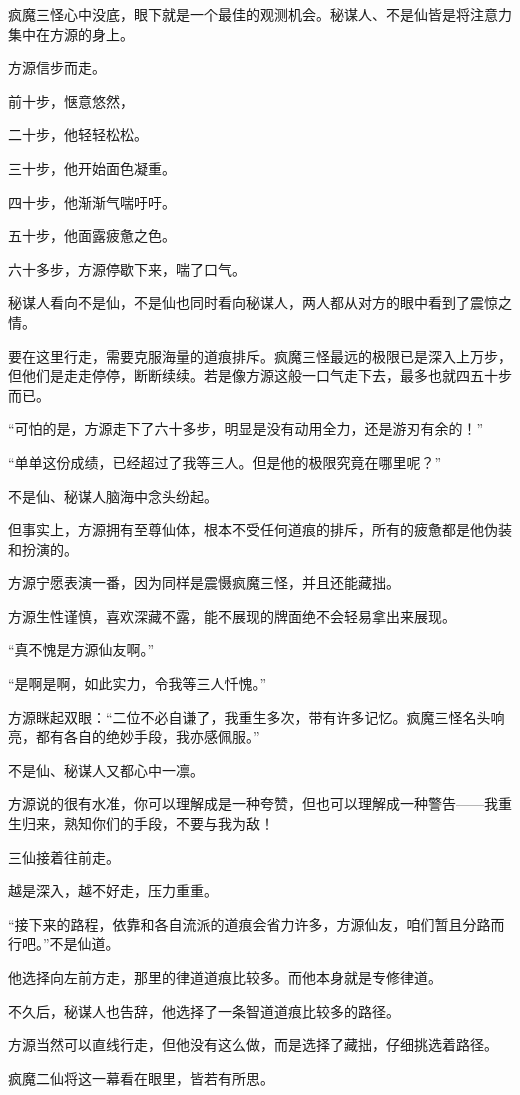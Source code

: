 \begin{this_body}
疯魔三怪心中没底，眼下就是一个最佳的观测机会。秘谋人、不是仙皆是将注意力集中在方源的身上。

方源信步而走。

前十步，惬意悠然，

二十步，他轻轻松松。

三十步，他开始面色凝重。

四十步，他渐渐气喘吁吁。

五十步，他面露疲惫之色。

六十多步，方源停歇下来，喘了口气。

秘谋人看向不是仙，不是仙也同时看向秘谋人，两人都从对方的眼中看到了震惊之情。

要在这里行走，需要克服海量的道痕排斥。疯魔三怪最远的极限已是深入上万步，但他们是走走停停，断断续续。若是像方源这般一口气走下去，最多也就四五十步而已。

“可怕的是，方源走下了六十多步，明显是没有动用全力，还是游刃有余的！”

“单单这份成绩，已经超过了我等三人。但是他的极限究竟在哪里呢？”

不是仙、秘谋人脑海中念头纷起。

但事实上，方源拥有至尊仙体，根本不受任何道痕的排斥，所有的疲惫都是他伪装和扮演的。

方源宁愿表演一番，因为同样是震慑疯魔三怪，并且还能藏拙。

方源生性谨慎，喜欢深藏不露，能不展现的牌面绝不会轻易拿出来展现。

“真不愧是方源仙友啊。”

“是啊是啊，如此实力，令我等三人忏愧。”

方源眯起双眼：“二位不必自谦了，我重生多次，带有许多记忆。疯魔三怪名头响亮，都有各自的绝妙手段，我亦感佩服。”

不是仙、秘谋人又都心中一凛。

方源说的很有水准，你可以理解成是一种夸赞，但也可以理解成一种警告——我重生归来，熟知你们的手段，不要与我为敌！

三仙接着往前走。

越是深入，越不好走，压力重重。

“接下来的路程，依靠和各自流派的道痕会省力许多，方源仙友，咱们暂且分路而行吧。”不是仙道。

他选择向左前方走，那里的律道道痕比较多。而他本身就是专修律道。

不久后，秘谋人也告辞，他选择了一条智道道痕比较多的路径。

方源当然可以直线行走，但他没有这么做，而是选择了藏拙，仔细挑选着路径。

疯魔二仙将这一幕看在眼里，皆若有所思。

\end{this_body}

